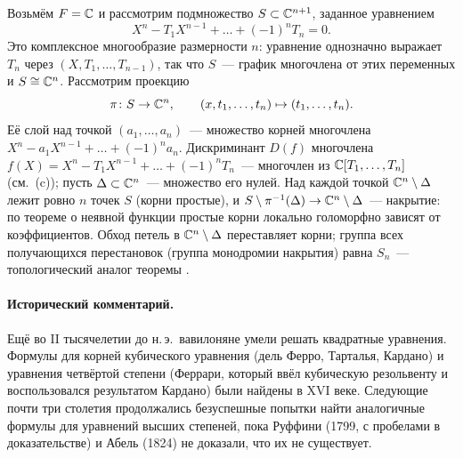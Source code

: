 \begin{aside}
Возьмём $F=\mathbb C$ и рассмотрим подмножество $S\subset\mathbb C^{n+1}$, заданное уравнением
\[
X^n-T_1X^{n-1}+\dots+(-1)^nT_n=0 .
\]
Это комплексное многообразие размерности $n$: уравнение однозначно выражает $T_n$ через $(X,T_1,\dots,T_{n-1})$, так что
$S$~--- график многочлена от этих переменных и $S\cong\mathbb C^n$. Рассмотрим проекцию
\[
\pi\colon S\to\mathbb C^n,\qquad (x,t_1,\dots,t_n)\mapsto(t_1,\dots,t_n).
\]
Её слой над точкой $(a_1,\dots,a_n)$~--- множество корней многочлена $X^n-a_1X^{n-1}+\dots+(-1)^na_n$. Дискриминант
$D(f)$ многочлена $f(X)=X^n-T_1X^{n-1}+\dots+(-1)^nT_n$~--- многочлен из $\mathbb C[T_1,\dots,T_n]$ (см.\ (c)); пусть
$\Delta\subset\mathbb C^n$~--- множество его нулей. Над каждой точкой $\mathbb C^n\setminus\Delta$ лежит ровно $n$ точек $S$ (корни
простые), и $S\setminus\pi^{-1}(\Delta)\to\mathbb C^n\setminus\Delta$~--- накрытие: по теореме о неявной функции простые
корни локально голоморфно зависят от коэффициентов. Обход петель в $\mathbb C^n\setminus\Delta$ переставляет корни; группа
всех получающихся перестановок (группа монодромии накрытия) равна $S_n$~--- топологический аналог теоремы .
\end{aside}

\paragraph{Исторический комментарий.} Ещё во II тысячелетии до н.\,э.\ вавилоняне умели решать квадратные
уравнения. Формулы для корней кубического уравнения (дель Ферро, Тарталья, Кардано) и уравнения четвёртой степени
(Феррари, который ввёл кубическую резольвенту и воспользовался результатом Кардано) были найдены в XVI веке. Следующие
почти три столетия продолжались безуспешные попытки найти аналогичные формулы для уравнений высших степеней, пока Руффини
(1799, с пробелами в доказательстве) и Абель (1824) не доказали, что их не существует.
